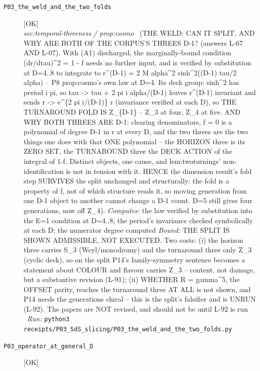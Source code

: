 \begin{description}
\item[\label{rcpt:P03_the_weld_and_the_two_folds}\texttt{P03\_the\_weld\_and\_the\_two\_folds}]\hfill\textsf{[OK]}\\
\textit{sec:temporal-threeness / prop:cosmo} \ (THE WELD: CAN IT SPLIT, AND WHY ARE BOTH OF THE CORPUS'S THREES D-1? (answers L-67 AND L-07). With (A1) discharged, the marginally-bound condition (dr/dtau)\textasciicircum{}2 = 1 - f needs no further input, and is verified by substitution at D=4..8 to integrate to r\textasciicircum{}(D-1) = 2 M alpha\textasciicircum{}2 sinh\textasciicircum{}2((D-1) tau/2 alpha) -- P8 prop:cosmo's own law at D=4. Its deck group: sinh\textasciicircum{}2 has period i pi, so tau -> tau + 2 pi i alpha/(D-1) leaves r\textasciicircum{}(D-1) invariant and sends r -> e\textasciicircum{}\{2 pi i/(D-1)\} r (invariance verified at each D), so THE TURNAROUND FOLD IS Z\_\{D-1\} -- Z\_3 at four, Z\_4 at five. AND WHY BOTH THREES ARE D-1: clearing denominators, f = 0 is a polynomial of degree D-1 in r at every D, and the two threes are the two things one does with that ONE polynomial -- the HORIZON three is its ZERO SET, the TURNAROUND three the DECK ACTION of the integral of 1-f. Distinct objects, one cause, and lem:twoturnings' non-identification is not in tension with it. HENCE the dimension result's fold step SURVIVES the split unchanged and structurally: the fold is a property of f, not of which structure reads it, so moving generation from one D-1 object to another cannot change a D-1 count. D=5 still gives four generations, now off Z\_4). 
\emph{Computes:} the law verified by substitution into the E=1 condition at D=4..8; the period's invariance checked symbolically at each D; the numerator degree computed
 \emph{Bound:} THE SPLIT IS SHOWN ADMISSIBLE, NOT EXECUTED. Two costs: (i) the horizon three carries S\_3 (Weyl/monodromy) and the turnaround three only Z\_3 (cyclic deck), so on the split P14's family-symmetry sentence becomes a statement about COLOUR and flavour carries Z\_3 -- content, not damage, but a substantive revision (L-91); (ii) WHETHER R = gamma\textasciicircum{}5, the OFFSET parity, reaches the turnaround three AT ALL is not shown, and P14 needs the generations chiral -- this is the split's falsifier and is UNRUN (L-92). The papers are NOT revised, and should not be until L-92 is run
\ \emph{Run:} \texttt{python3 receipts/P03\_SdS\_slicing/P03\_the\_weld\_and\_the\_two\_folds.py}
\item[\label{rcpt:P03_operator_at_general_D}\texttt{P03\_operator\_at\_general\_D}]\hfill\textsf{[OK]}\\

\end{description}
